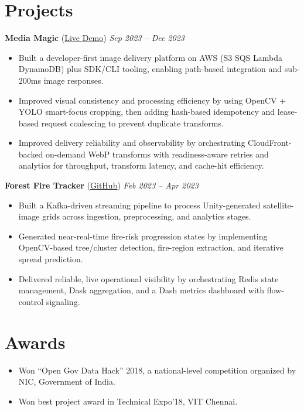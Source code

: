 \documentclass[10pt]{article}
\begin{document}
\vspace{0pt}

\section*{Projects}
\textbf{Media Magic} (\href{https://media-magic.umangshah.me}{Live Demo}) \hfill \textit{Sep 2023 -- Dec 2023} \\
\vspace{0pt}
\begin{itemize}
  \item Built a developer-first image delivery platform on AWS (S3 \textrightarrow{} SQS \textrightarrow{} Lambda \textrightarrow{} DynamoDB) plus SDK/CLI tooling, enabling path-based integration and sub-200ms image responses.
  \item Improved visual consistency and processing efficiency by using OpenCV + YOLO smart-focus cropping, then adding hash-based idempotency and lease-based request coalescing to prevent duplicate transforms.
  \item Improved delivery reliability and observability by orchestrating CloudFront-backed on-demand WebP transforms with readiness-aware retries and analytics for throughput, transform latency, and cache-hit efficiency.
\end{itemize}

\textbf{Forest Fire Tracker} (\href{https://github.com/umangshah-js/forest-fire-tracker}{GitHub}) \hfill \textit{Feb 2023 -- Apr 2023} \\
\vspace{0pt}
\begin{itemize}
  \item Built a Kafka-driven streaming pipeline to process Unity-generated satellite-image grids across ingestion, preprocessing, and analytics stages.
  \item Generated near-real-time fire-risk progression states by implementing OpenCV-based tree/cluster detection, fire-region extraction, and iterative spread prediction.
  \item Delivered reliable, live operational visibility by orchestrating Redis state management, Dask aggregation, and a Dash metrics dashboard with flow-control signaling.
\end{itemize}

\vspace{0pt}

\section*{Awards}
\begin{itemize}
  \item Won ``Open Gov Data Hack'' 2018, a national-level competition organized by NIC, Government of India.
  \item Won best project award in Technical Expo'18, VIT Chennai.
\end{itemize}
\end{document}
